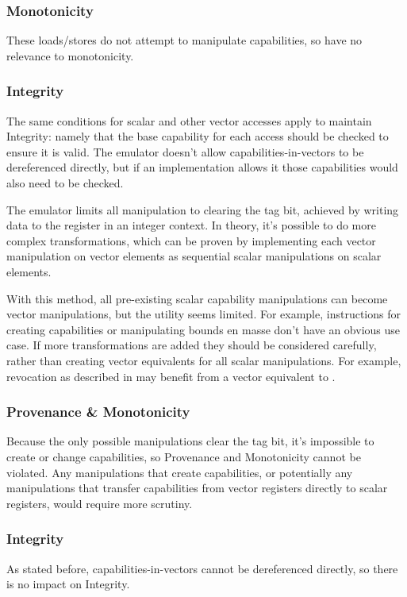 \subsubsection*{Monotonicity}
These loads/stores do not attempt to manipulate capabilities, so have no relevance to monotonicity.

\subsubsection*{Integrity}
The same conditions for scalar and other vector accesses apply to maintain Integrity: namely that the base capability for each access should be checked to ensure it is valid.
The emulator doesn't allow capabilities-in-vectors to be dereferenced directly, but if an implementation allows it those capabilities would also need to be checked.

\pagebreak
{}
The emulator limits all manipulation to clearing the tag bit, achieved by writing data to the register in an integer context.
In theory, it's possible to do more complex transformations, which can be proven by implementing each vector manipulation on vector elements as sequential scalar manipulations on scalar elements.

With this method, all pre-existing scalar capability manipulations can become vector manipulations, but the utility seems limited.
For example, instructions for creating capabilities or manipulating bounds en masse don't have an obvious use case.
If more transformations are added they should be considered carefully, rather than creating vector equivalents for all scalar manipulations.
For example, revocation as described in \cite{xiaCHERIvokeCharacterisingPointer2019} may benefit from a vector equivalent to .

\subsubsection*{Provenance \& Monotonicity}
Because the only possible manipulations clear the tag bit, it's impossible to create or change capabilities, so Provenance and Monotonicity cannot be violated.
Any manipulations that create capabilities, or potentially any manipulations that transfer capabilities from vector registers directly to scalar registers, would require more scrutiny.

\subsubsection*{Integrity}
As stated before, capabilities-in-vectors cannot be dereferenced directly, so there is no impact on Integrity.
